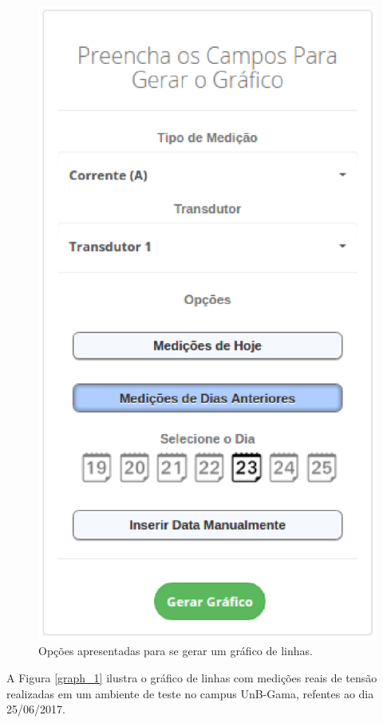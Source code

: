 \begin{figure}[!h]
    \centering
    \includegraphics[keepaspectratio=true, scale=0.7]{figuras/graph_options.eps}
    \caption{Opções apresentadas para se gerar um gráfico de linhas.}
    \label{graph_options}
\end{figure}

A Figura \ref{graph_1} ilustra o gráfico de linhas com medições reais de tensão realizadas em um ambiente de teste no campus UnB-Gama, refentes ao dia 25/06/2017.


